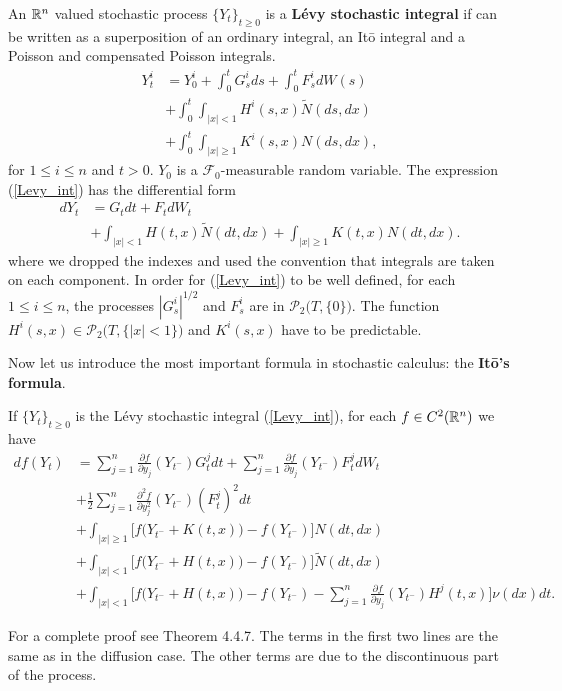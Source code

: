 An $\mathbb{R}^n$ valued stochastic process $\{Y_t\}_{t \ge 0}$ is a \textbf{Lévy stochastic integral} if can be written as a superposition of
an ordinary integral, an It\={o} integral and a Poisson and compensated Poisson integrals.  
\begin{align} \label{Levy_int}
 Y^i_t &= Y^i_0 + \int_0^{t} G^i_s ds  + \int_0^{t} F^i_s dW(s)\\ \nonumber
     &+ \int_0^{t} \int_{|x|<1} H^i(s,x) \tilde N (ds,dx)\\ \nonumber
     &+ \int_0^{t} \int_{|x|\geq 1} K^i(s,x) N(ds,dx),
\end{align}
for $1 \leq i \leq n$ and $t>0$.  $Y_0$ is a $\mathcal{F}_0$-measurable random variable. 
The expression (\ref{Levy_int}) has the differential form
\begin{align} \label{Levy_diff}
 dY_t &= G_t dt  + F_t dW_t \\ \nonumber
     &+ \int_{|x|<1} H(t,x) \tilde N (dt,dx) + \int_{|x|\geq 1} K(t,x) N(dt,dx).
\end{align}
where we dropped the indexes and used the convention that integrals are taken on each component.
In order for (\ref{Levy_int}) to be well defined, for each $1 \leq i \leq n$, the processes $|G^i_s|^{1/2}$ and $F^i_s$ are in $\mathcal{P}_2 \bigl( T,\{0\} \bigr)$.
The function $H^i(s,x) \in \mathcal{P}_2 \bigl( T, \{ |x|<1 \} \bigr)$ 
and $K^i(s,x)$ have to be predictable.

Now let us introduce the most important formula in stochastic calculus: the \textbf{It\={o}'s formula}.
\begin{Theorem}
If $\{Y_t\}_{t \ge 0}$ is the Lévy stochastic integral (\ref{Levy_int}), for each $f \in C^2(\mathbb{R}^n)$ we have  
\begin{align} \label{Ito_form}
 df(Y_t) &=  \sum_{j=1}^n \frac{\partial f}{\partial y_j}(Y_{t^-}) G^j_t  dt  + \sum_{j=1}^n \frac{\partial f}{\partial y_j}(Y_{t^-}) F^j_t dW_t \\ \nonumber
          &+ \frac{1}{2} \sum_{j=1}^n \frac{\partial^2 f}{\partial y_j^2}(Y_{t^-}) (F^j_t)^2 dt \\ \nonumber 
          &+ \int_{|x|\geq 1} \bigl[ f\bigl( Y_{t^-} + K(t,x) \bigr) - f( Y_{t^-} ) \bigr] N(dt,dx) \\ \nonumber
          &+ \int_{|x|< 1} \bigl[ f\bigl( Y_{t^-} + H(t,x) \bigr) - f(Y_{t^-}) \bigr] \tilde N(dt,dx) \\ \nonumber  
          &+ \int_{|x|< 1} \bigl[ f\bigl( Y_{t^-} + H(t,x) \bigr) - f(Y_{t^-}) - \sum_{j=1}^n \frac{\partial f}{\partial y_j}(Y_{t^-}) H^j(t,x) \bigr] \nu(dx)dt. \nonumber
\end{align}
\end{Theorem}
For a complete proof see \cite{Applebaum} Theorem 4.4.7.
The terms in the first two lines are the same as in
the diffusion case. The other terms are due to the discontinuous part of the process.

